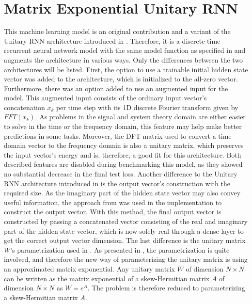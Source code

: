 \documentclass[draft,final]{vutinfth} %
\begin{document}
    \section{Matrix Exponential Unitary RNN} \label{meurnn}
    This machine learning model is an original contribution and a variant of the Unitary RNN architecture introduced in .
    Therefore, it is a discrete-time recurrent neural network model with the same model function as specified in  and augments the architecture in various ways.
    Only the differences between the two architectures will be listed.
    First, the option to use a trainable initial hidden state vector was added to the architecture, which is initialized to the all-zero vector.
    Furthermore, there was an option added to use an augmented input for the model.
    This augmented input consists of the ordinary input vector's concatenation $x_k$ per time step with its 1D discrete Fourier transform given by $FFT(x_k)$.
    As problems in the signal and system theory domain are either easier to solve in the time or the frequency domain, this feature may help make better predictions in some tasks.
    Moreover, the DFT matrix used to convert a time-domain vector to the frequency domain is also a unitary matrix, which preserves the input vector's energy and is, therefore, a good fit for this architecture.
    Both described features are disabled during benchmarking this model, as they showed no substantial decrease in the final test loss.
    Another difference to the Unitary RNN architecture introduced in  is the output vector's construction with the required size.
    As the imaginary part of the hidden state vector may also convey useful information, the approach from \cite[p. 4]{UnitaryRNNs} was used in the implementation to construct the output vector.
    With this method, the final output vector is constructed by passing a concatenated vector consisting of the real and imaginary part of the hidden state vector, which is now solely real through a dense layer to get the correct output vector dimension.
    The last difference is the unitary matrix $W$'s parametrization used in .
    As presented in , the parametrization is quite involved, and therefore the new way of parameterizing the unitary matrix is using an approximated matrix exponential.
    Any unitary matrix $W$ of dimension $N \times N$ can be written as the matrix exponential of a skew-Hermitian matrix $A$ of dimension $N \times N$ as $W=e^A$. The problem is therefore reduced to parameterizing a skew-Hermitian matrix $A$.
\end{document}
